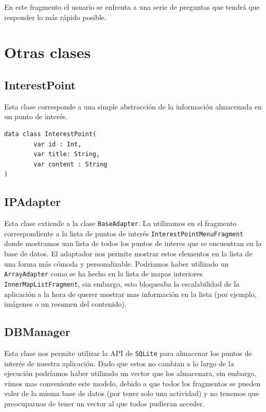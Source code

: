 \documentclass[11pt]{article}
\begin{document}
En este fragmento el usuario se enfrenta a una serie de preguntas que tendrá que responder lo más rápido posible. 

\section{Otras clases}
\label{sec:org5a72dbc}

\subsection{InterestPoint}
\label{sec:orgd5c92b3}

Esta clase corresponde a una simple abstracción de la información almacenada en un punto de interés.

\begin{verbatim}
data class InterestPoint(
        var id : Int,
        var title: String,
        var content : String
)
\end{verbatim}


\subsection{IPAdapter}
\label{sec:org9b42399}

Esta clase extiende a la clase \texttt{BaseAdapter}. La utilizamos en el fragmento correspondiente a la lista de puntos de interés \texttt{InterestPointMenuFragment} donde mostramos uan lista de todos los puntos de interes que se encuentran en la base de datos.
El adaptador nos permite mostrar estos elementos en la lista de una forma más cómoda y personalizable. Podriamos haber utilizado un \texttt{ArrayAdapter} como se ha hecho en la lista de mapas interiores \texttt{InnerMapListFragment}, sin embargo, esto bloqueaba la escalabilidad de la aplicación a la hora de querer mostrar mas información en la lista (por ejemplo, imágenes o un resumen del contenido).


\subsection{DBManager}
\label{sec:org1f989f6}

Esta clase nos permite utilizar la API de \texttt{SQLite} para almacenar los puntos de interés de nuestra aplicación. Dado que estos no cambian a lo largo de la ejecución podríamos haber utilizado un vector que los almacenara, sin embargo, vimos mas conveniente este modelo, debido a que todos los fragmentos se pueden valer de la misma base de datos (por tener solo una actividad) y no tenemos que preocuparnos de tener un vector al que todos pudieran acceder.
\end{document}
